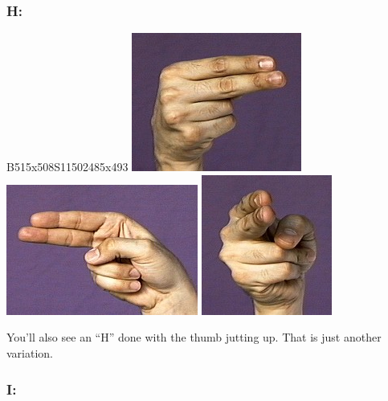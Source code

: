 \documentclass{article}
\begin{document}
\subsubsection{H:}

B515x508S11502485x493
\includegraphics[scale=0.5]{images/h1.jpg}
\includegraphics[scale=0.5]{images/h2.jpg}
\includegraphics[scale=0.5]{images/h3.jpg}

You'll also see an ``H'' done with the thumb jutting up.
That is just another variation.

\subsubsection{I:}
\end{document}
